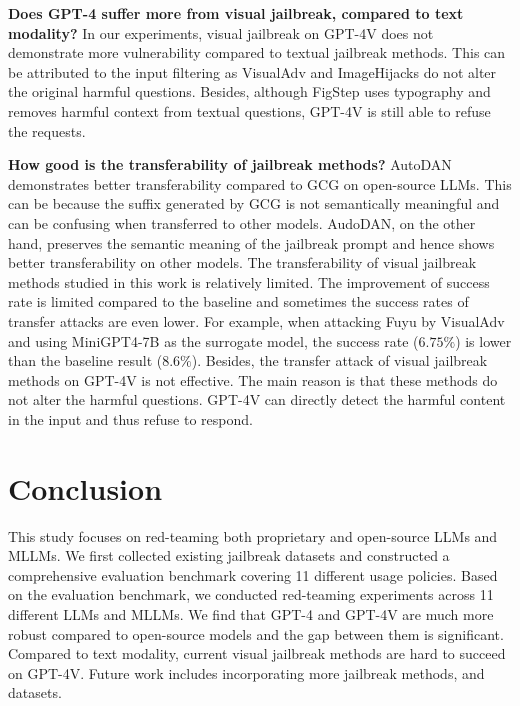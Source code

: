 \noindent\textbf{Does GPT-4 suffer more from visual jailbreak, compared to text modality?} In our experiments, visual jailbreak on GPT-4V does not demonstrate more vulnerability compared to textual jailbreak methods. This can be attributed to the input filtering as VisualAdv and ImageHijacks do not alter the original harmful questions. Besides, although FigStep uses typography and removes harmful context from textual questions, GPT-4V is still able to refuse the requests. 

\noindent\textbf{How good is the transferability of jailbreak methods?} AutoDAN demonstrates better transferability compared to GCG on open-source LLMs. This can be because the suffix generated by GCG is not semantically meaningful and can be confusing when transferred to other models. AudoDAN, on the other hand, preserves the semantic meaning of the jailbreak prompt and hence shows better transferability on other models.
The transferability of visual jailbreak methods studied in this work is relatively limited. The improvement of success rate is limited compared to the baseline and sometimes the success rates of transfer attacks are even lower. For example, when attacking Fuyu by VisualAdv and using MiniGPT4-7B as the surrogate model, the success rate ($6.75\%$) is lower than the baseline result ($8.6\%$). Besides, the transfer attack of visual jailbreak methods on GPT-4V is not effective. The main reason is that these methods do not alter the harmful questions. GPT-4V can directly detect the harmful content in the input and thus refuse to respond. 

\section{Conclusion}
This study focuses on red-teaming both proprietary and open-source LLMs and MLLMs. We first collected existing jailbreak datasets and constructed a comprehensive evaluation benchmark covering 11 different usage policies. Based on the evaluation benchmark, we conducted red-teaming experiments across 11 different LLMs and MLLMs. We find that GPT-4 and GPT-4V are much more robust compared to open-source models and the gap between them is significant. Compared to text modality, current visual jailbreak methods are hard to succeed on GPT-4V. Future work includes incorporating more jailbreak methods, and datasets.

